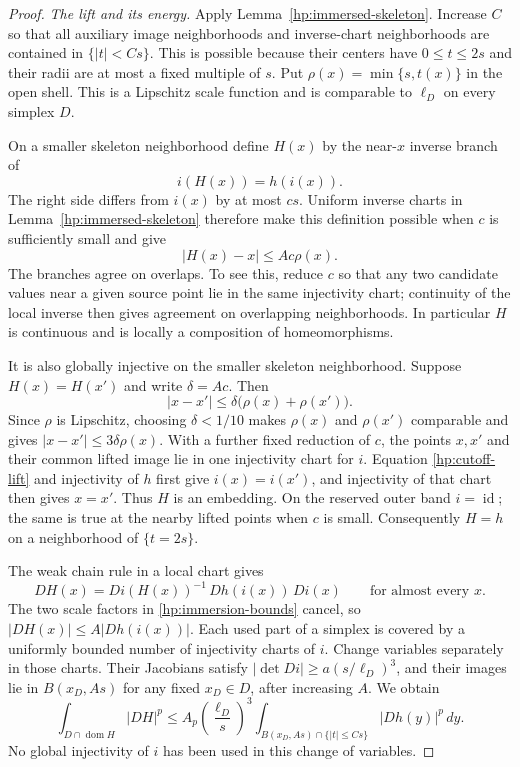 \documentclass[11pt]{article}
\numberwithin{equation}{section}
\theoremstyle{definition}
\theoremstyle{remark}
\begin{document}
\begin{proof}
\emph{The lift and its energy.}
Apply Lemma~\ref{hp:immersed-skeleton}.  Increase $C$ so that all
auxiliary image neighborhoods and inverse-chart neighborhoods are
contained in $\{|t|<Cs\}$.  This is possible because their centers have
$0\leq t\leq2s$ and their radii are at most a fixed multiple of $s$.
Put $\rho(x)=\min\{s,t(x)\}$ in the open shell.  This is a Lipschitz
scale function and is comparable to $\ell_D$ on every simplex $D$.

On a smaller skeleton neighborhood define $H(x)$ by the near-$x$
inverse branch of
\begin{equation}\label{hp:cutoff-lift}
 i(H(x))=h(i(x)).
\end{equation}
The right side differs from $i(x)$ by at most $cs$.  Uniform inverse
charts in Lemma~\ref{hp:immersed-skeleton} therefore make this
definition possible when $c$ is sufficiently small and give
\begin{equation}\label{hp:lift-displacement}
 |H(x)-x|\leq A c\rho(x).
\end{equation}
The branches agree on overlaps.  To see this, reduce $c$ so that any
two candidate values near a given source point lie in the same
injectivity chart; continuity of the local inverse then gives agreement
on overlapping neighborhoods.  In particular $H$ is continuous and
is locally a composition of homeomorphisms.

It is also globally injective on the smaller skeleton neighborhood.
Suppose $H(x)=H(x')$ and write $\delta=Ac$.  Then
\[
 |x-x'|\leq\delta\bigl(\rho(x)+\rho(x')\bigr).
\]
Since $\rho$ is Lipschitz, choosing $\delta<1/10$ makes $\rho(x)$ and
$\rho(x')$ comparable and gives $|x-x'|\leq3\delta\rho(x)$.
With a further fixed reduction of $c$, the points $x,x'$ and their
common lifted image lie in one injectivity chart for $i$.  Equation
\eqref{hp:cutoff-lift} and injectivity of $h$ first give
$i(x)=i(x')$, and injectivity of that chart then gives $x=x'$.
Thus $H$ is an embedding.  On the reserved outer band $i=\operatorname{id}$; the
same is true at the nearby lifted points when $c$ is small.  Consequently
$H=h$ on a neighborhood of $\{t=2s\}$.

The weak chain rule in a local chart gives
\[
 DH(x)=Di(H(x))^{-1}\,Dh(i(x))\,Di(x)
 \qquad\text{for almost every }x.
\]
The two scale factors in \eqref{hp:immersion-bounds} cancel, so
$|DH(x)|\leq A|Dh(i(x))|$.  Each used part of a simplex is covered by
a uniformly bounded number of injectivity charts of $i$.  Change
variables separately in those charts.  Their Jacobians satisfy
$|\det Di|\geq a(s/\ell_D)^3$, and their images lie in
$B(x_D,As)$ for any fixed $x_D\in D$, after increasing $A$.  We obtain
\begin{equation}\label{hp:lift-cell-energy}
 \int_{D\cap\operatorname{dom}H}|DH|^p
 \leq A_p\left(\frac{\ell_D}{s}\right)^3
       \int_{B(x_D,As)\cap\{|t|\leq Cs\}}|Dh(y)|^p\,dy.
\end{equation}
No global injectivity of $i$ has been used in this change of variables.


\end{proof}
\end{document}
